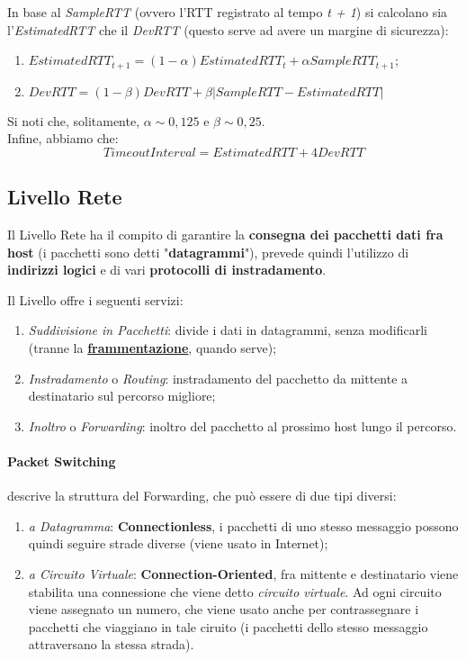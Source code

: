 \documentclass[a4paper]{article}
\begin{document}
					In base al \emph{SampleRTT} (ovvero l'RTT registrato al tempo \emph{t + 1}) si calcolano sia l'\emph{EstimatedRTT} che il \emph{DevRTT} (questo serve ad avere un margine di sicurezza):
					\begin{enumerate}
						\item \( EstimatedRTT_{t + 1} = (1 - \alpha) EstimatedRTT_{t} + \alpha SampleRTT_{t + 1} \);
						\item \( DevRTT = (1 - \beta) DevRTT + \beta |SampleRTT - EstimatedRTT| \)
					\end{enumerate}					 
					
					Si noti che, solitamente, \( \alpha \sim 0,125\) e \( \beta \sim 0,25 \).	
					\\
					
					Infine, abbiamo che:
					\[ TimeoutInterval = EstimatedRTT + 4DevRTT \]
					
					
		\subsection{Livello Rete}	
		
			Il Livello Rete ha il compito di garantire la \textbf{consegna dei pacchetti dati fra host} (i pacchetti sono detti "\textbf{datagrammi}"), prevede quindi l'utilizzo di \textbf{indirizzi logici} e di vari \textbf{protocolli di instradamento}.
			
			Il Livello offre i seguenti servizi:
			\begin{enumerate}
				\item \emph{Suddivisione in Pacchetti}: divide i dati in datagrammi, senza modificarli (tranne la \hyperref[par:frammentazione]{\textbf{frammentazione}}, quando serve);
				\item \emph{Instradamento} o \emph{Routing}: instradamento del pacchetto da mittente a destinatario sul percorso migliore;
				\item \emph{Inoltro} o \emph{Forwarding}: inoltro del pacchetto al prossimo host lungo il percorso.
			\end{enumerate}
			
			\paragraph{Packet Switching}
				descrive la struttura del Forwarding, che può essere di due tipi diversi:
				\begin{enumerate}
					\item \emph{a Datagramma}: \textbf{Connectionless}, i pacchetti di uno stesso messaggio possono quindi seguire strade diverse (viene usato in Internet);
					\item \emph{a Circuito Virtuale}: \textbf{Connection-Oriented}, fra mittente e destinatario viene stabilita una connessione che viene detto \emph{circuito virtuale}. Ad ogni circuito viene assegnato un numero, che viene usato anche per contrassegnare i pacchetti che viaggiano in tale ciruito (i pacchetti dello stesso messaggio attraversano la stessa strada).
				\end{enumerate}							
				
\end{document}
